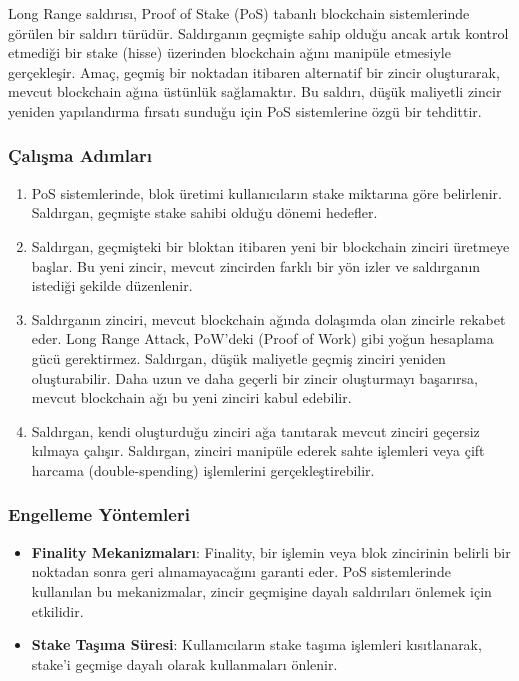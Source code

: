 Long Range saldırısı, Proof of Stake (PoS) tabanlı blockchain sistemlerinde görülen bir saldırı türüdür. Saldırganın geçmişte sahip olduğu ancak artık kontrol etmediği bir stake (hisse) üzerinden blockchain ağını manipüle etmesiyle gerçekleşir. Amaç, geçmiş bir noktadan itibaren alternatif bir zincir oluşturarak, mevcut blockchain ağına üstünlük sağlamaktır. Bu saldırı, düşük maliyetli zincir yeniden yapılandırma fırsatı sunduğu için PoS sistemlerine özgü bir tehdittir.

\subsubsection{Çalışma Adımları}

\begin{enumerate}
    \item PoS sistemlerinde, blok üretimi kullanıcıların stake miktarına göre belirlenir. Saldırgan, geçmişte stake sahibi olduğu dönemi hedefler.
    \item Saldırgan, geçmişteki bir bloktan itibaren yeni bir blockchain zinciri üretmeye başlar. Bu yeni zincir, mevcut zincirden farklı bir yön izler ve saldırganın istediği şekilde düzenlenir.
    \item Saldırganın zinciri, mevcut blockchain ağında dolaşımda olan zincirle rekabet eder. Long Range Attack, PoW'deki (Proof of Work) gibi yoğun hesaplama gücü gerektirmez. Saldırgan, düşük maliyetle geçmiş zinciri yeniden oluşturabilir. Daha uzun ve daha geçerli bir zincir oluşturmayı başarırsa, mevcut blockchain ağı bu yeni zinciri kabul edebilir. 
    \item Saldırgan, kendi oluşturduğu zinciri ağa tanıtarak mevcut zinciri geçersiz kılmaya çalışır. Saldırgan, zinciri manipüle ederek sahte işlemleri veya çift harcama (double-spending) işlemlerini gerçekleştirebilir.
\end{enumerate}

\subsubsection{Engelleme Yöntemleri}

\begin{itemize}
    \item \textbf{Finality Mekanizmaları}: Finality, bir işlemin veya blok zincirinin belirli bir noktadan sonra geri alınamayacağını garanti eder. PoS sistemlerinde kullanılan bu mekanizmalar, zincir geçmişine dayalı saldırıları önlemek için etkilidir.
    \item \textbf{Stake Taşıma Süresi}: Kullanıcıların stake taşıma işlemleri kısıtlanarak, stake'i geçmişe dayalı olarak kullanmaları önlenir.
\end{itemize}

